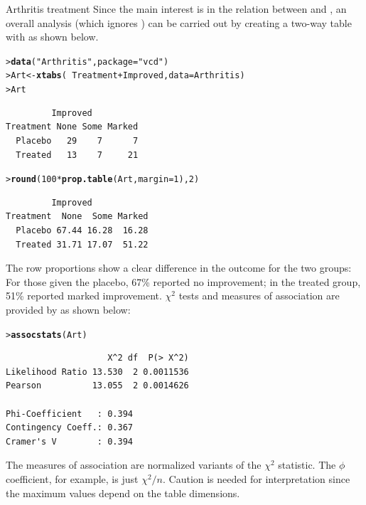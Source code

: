 \documentclass[10pt,krantz2]{krantz}\usepackage[]{graphicx}\usepackage[]{color}
\makeatletter
\newcommand{\hlnum}[1]{\textcolor[rgb]{0.686,0.059,0.569}{#1}}%
\newcommand{\hlstr}[1]{\textcolor[rgb]{0.192,0.494,0.8}{#1}}%
\newcommand{\hlopt}[1]{\textcolor[rgb]{0,0,0}{#1}}%
\newcommand{\hlstd}[1]{\textcolor[rgb]{0.345,0.345,0.345}{#1}}%
\newcommand{\hlkwb}[1]{\textcolor[rgb]{0.69,0.353,0.396}{#1}}%
\newcommand{\hlkwc}[1]{\textcolor[rgb]{0.333,0.667,0.333}{#1}}%
\newcommand{\hlkwd}[1]{\textcolor[rgb]{0.737,0.353,0.396}{\textbf{#1}}}%
\newenvironment{kframe}{%
 \def\at@end@of@kframe{}%
 \ifinner\ifhmode%
  \def\at@end@of@kframe{\end{minipage}}%
  \begin{minipage}{\columnwidth}%
 \fi\fi%
 \def\FrameCommand##1{\hskip\@totalleftmargin \hskip-\fboxsep
 \colorbox{shadecolor}{##1}\hskip-\fboxsep
     \hskip-\linewidth \hskip-\@totalleftmargin \hskip\columnwidth}%
 \MakeFramed {\advance\hsize-\width
   \@totalleftmargin\z@ \linewidth\hsize
   \@setminipage}}%
 {\par\unskip\endMakeFramed%
 \at@end@of@kframe}
\newenvironment{knitrout}{}{} %
\renewenvironment{knitrout}{\small\renewcommand{\baselinestretch}{.85}}{} %
\makeatother
\begin{document}
\begin{Example}[arthrit2]{Arthritis treatment}
Since the main interest is in the relation between  and
, an overall analysis (which ignores ) can be carried out
by creating a two-way table with 
as shown below.
\begin{knitrout}
\color{fgcolor}\begin{kframe}
\begin{alltt}
\hlstd{> }\hlkwd{data}\hlstd{(}\hlstr{"Arthritis"}\hlstd{,} \hlkwc{package}\hlstd{=}\hlstr{"vcd"}\hlstd{)}
\hlstd{> }\hlstd{Art} \hlkwb{<-} \hlkwd{xtabs}\hlstd{(}\hlopt{~} \hlstd{Treatment} \hlopt{+} \hlstd{Improved,} \hlkwc{data} \hlstd{= Arthritis)}
\hlstd{> }\hlstd{Art}
\end{alltt}
\begin{verbatim}
         Improved
Treatment None Some Marked
  Placebo   29    7      7
  Treated   13    7     21
\end{verbatim}
\begin{alltt}
\hlstd{> }\hlkwd{round}\hlstd{(}\hlnum{100} \hlopt{*} \hlkwd{prop.table}\hlstd{(Art,} \hlkwc{margin} \hlstd{=} \hlnum{1}\hlstd{),} \hlnum{2}\hlstd{)}
\end{alltt}
\begin{verbatim}
         Improved
Treatment  None  Some Marked
  Placebo 67.44 16.28  16.28
  Treated 31.71 17.07  51.22
\end{verbatim}
\end{kframe}
\end{knitrout}
The row proportions show a clear difference in the outcome for the two groups:
For those given the placebo, 67\% reported no improvement;
in the treated group, 51\% reported marked improvement.  $\chi^2$ tests
and measures of association are provided by  as shown below:
\begin{knitrout}
\color{fgcolor}\begin{kframe}
\begin{alltt}
\hlstd{> }\hlkwd{assocstats}\hlstd{(Art)}
\end{alltt}
\begin{verbatim}
                    X^2 df  P(> X^2)
Likelihood Ratio 13.530  2 0.0011536
Pearson          13.055  2 0.0014626

Phi-Coefficient   : 0.394 
Contingency Coeff.: 0.367 
Cramer's V        : 0.394 
\end{verbatim}
\end{kframe}
\end{knitrout}
\end{Example}
\noindent The measures of association are normalized variants of the
$\chi^2$ statistic. The $\phi$ coefficient, for example, is just
$\chi^2/n$. Caution is needed for interpretation since the maximum
values depend on the table dimensions.
\end{document}
